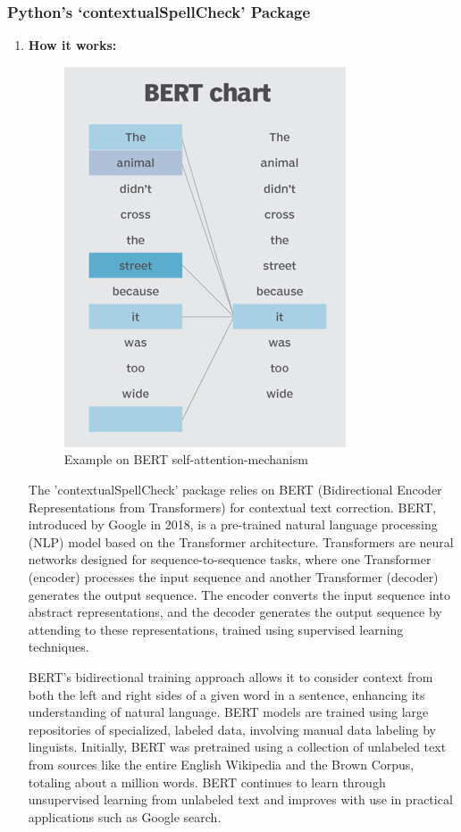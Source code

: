 \subsubsection{Python's ‘contextualSpellCheck’ Package}
\begin{enumerate}
    \item \textbf{How it works:}
 \begin{figure}
\centering
\includegraphics[]{bert.PNG}
\caption{Example on BERT self-attention-mechanism}
\label{fig:bert}
\end{figure}
    The 'contextualSpellCheck' package relies on BERT (Bidirectional Encoder Representations from Transformers) for contextual text correction. BERT, introduced by Google in 2018, is a pre-trained natural language processing (NLP) model based on the Transformer architecture. Transformers are neural networks designed for sequence-to-sequence tasks, where one Transformer (encoder) processes the input sequence and another Transformer (decoder) generates the output sequence. The encoder converts the input sequence into abstract representations, and the decoder generates the output sequence by attending to these representations, trained using supervised learning techniques. 
    
    BERT's bidirectional training approach allows it to consider context from both the left and right sides of a given word in a sentence, enhancing its understanding of natural language. BERT models are trained using large repositories of specialized, labeled data, involving manual data labeling by linguists. Initially, BERT was pretrained using a collection of unlabeled text from sources like the entire English Wikipedia and the Brown Corpus, totaling about a million words. BERT continues to learn through unsupervised learning from unlabeled text and improves with use in practical applications such as Google search. 
    

\end{enumerate}
